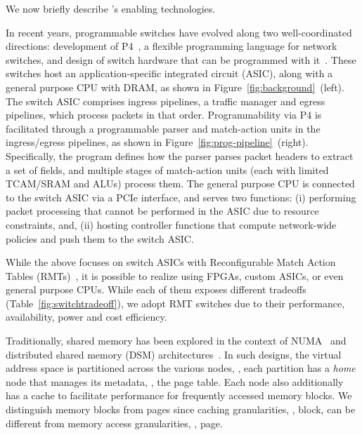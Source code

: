 We now briefly describe \mind's enabling technologies.

 In recent years, programmable switches have evolved along two well-coordinated directions: development of P4~\cite{p4, p4paper, dcp4}, a flexible programming language for network switches, and design of switch hardware that can be programmed with it~\cite{rmt, progswitch2, progswitch3, progswitch4}. These switches host an application-specific integrated circuit (ASIC), along with a general purpose CPU with DRAM, as shown in Figure~\ref{fig:background}~(left). The switch ASIC comprises ingress pipelines, a traffic manager and egress pipelines, which process packets in that order. Programmability via P4 is facilitated through a programmable parser and match-action units in the ingress/egress pipelines, as shown in Figure~\ref{fig:prog-pipeline}~(right). Specifically, the program defines how the parser parses packet headers to extract a set of fields, and multiple stages of match-action units (each with limited TCAM/SRAM and ALUs) process them. The general purpose CPU is connected to the switch ASIC via a PCIe interface, and serves two functions: (i) performing packet processing that cannot be performed in the ASIC due to resource constraints, and, (ii) hosting controller functions that compute network-wide policies and push them to the switch ASIC.

While the above focuses on switch ASICs with Reconfigurable Match Action Tables (RMTs)~\cite{rmt}, it is possible to realize \mind using FPGAs, custom ASICs, or even general purpose CPUs. While each of them exposes different tradeoffs (Table~\ref{fig:switchtradeoff}), we adopt RMT switches due to their performance, availability, power and cost efficiency.

 Traditionally, shared memory has been explored in the context of NUMA~\cite{sgiorigin, amdopteron1, amdopteron2, intelqpi1, intelqpi2} and distributed shared memory (DSM) architectures~\cite{munin, midway, dpram, gam, dash}. In such designs, the virtual address space is partitioned across the various nodes, \ie, each partition has a \textit{home} node that manages its metadata, \eg, the page table. Each node also additionally has a cache to facilitate performance for frequently accessed memory blocks. We distinguish memory blocks from pages since caching granularities, \ie, block, can be different from memory access granularities, \ie, page. 

